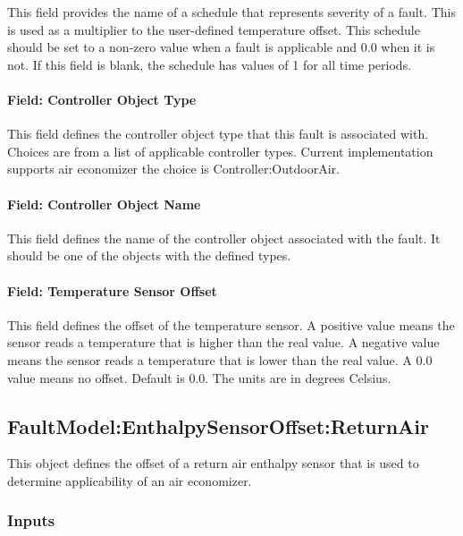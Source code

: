 This field provides the name of a schedule that represents severity of a fault. This is used as a multiplier to the user-defined temperature offset. This schedule should be set to a non-zero value when a fault is applicable and 0.0 when it is not. If this field is blank, the schedule has values of 1 for all time periods.

\paragraph{Field: Controller Object Type}\label{field-controller-object-type-3}

This field defines the controller object type that this fault is associated with. Choices are from a list of applicable controller types. Current implementation supports air economizer the choice is Controller:OutdoorAir.

\paragraph{Field: Controller Object Name}\label{field-controller-object-name-3}

This field defines the name of the controller object associated with the fault. It should be one of the objects with the defined types.

\paragraph{Field: Temperature Sensor Offset}\label{field-temperature-sensor-offset-1}

This field defines the offset of the temperature sensor. A positive value means the sensor reads a temperature that is higher than the real value. A negative value means the sensor reads a temperature that is lower than the real value. A 0.0 value means no offset. Default is 0.0. The units are in degrees Celsius.

\subsection{FaultModel:EnthalpySensorOffset:ReturnAir}\label{faultmodelenthalpysensoroffsetreturnair}

This object defines the offset of a return air enthalpy sensor that is used to determine applicability of an air economizer.

\subsubsection{Inputs}\label{inputs-4-020}

